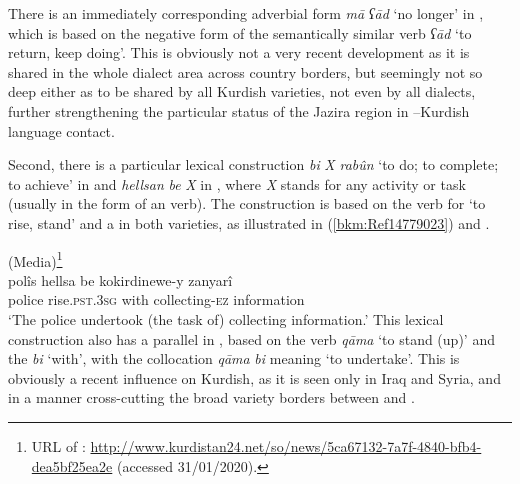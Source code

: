 \documentclass[output=paper]{langsci/langscibook}
\begin{document}
There is an immediately corresponding adverbial form \textit{mā} \textit{ʕād} ‘no longer’ in , which is based on the negative form of the semantically similar verb \textit{ʕād} ‘to return, keep doing’. This is obviously not a very recent development as it is shared in the whole dialect area across country borders, but seemingly not so deep either as to be shared by all Kurdish varieties, not even by all  dialects, further strengthening the particular status of the Jazira region in --Kurdish language contact. 

Second, there is a particular lexical construction \textit{bi} \textit{X} \textit{rabûn} ‘to do; to complete; to achieve’ in  and \textit{hellsan} \textit{be} \textit{X} in , where \textit{X} stands for any activity or task (usually in the form of an  verb). The construction is based on the verb for ‘to rise, stand’ and a  in both varieties, as illustrated in (\ref{bkm:Ref14779023}) and .

\ea {} (Media)\label{bkm:Ref14779023}\footnote{URL of : \url{http://www.kurdistan24.net/so/news/5ca67132-7a7f-4840-bfb4-dea5bf25ea2e} (accessed 31/01/2020).}\\
\gll polîs hellsa be kokirdinewe-y zanyarî\\
     police rise.\textsc{pst.3sg} with collecting-\textsc{ez} information\\
\glt ‘The police undertook (the task of) collecting information.’\z
{}
This lexical construction also has a parallel in  , based on the verb \textit{qāma} ‘to stand (up)’ and the  \textit{bi} ‘with’, with the collocation \textit{qāma} \textit{bi} meaning ‘to undertake’. This is obviously a recent influence on Kurdish, as it is seen only in Iraq and Syria, and in a manner cross-cutting the broad variety borders between  and . 
\end{document}
